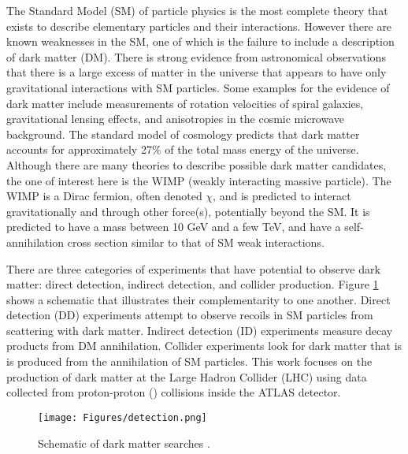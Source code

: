 \label{chapter:introduction}

The Standard Model (SM) of particle physics is the most complete theory that exists to describe elementary particles and their interactions. However there are known weaknesses in the SM, one of which is the failure to include a description of dark matter (DM). There is strong evidence from astronomical observations that there is a large excess of matter in the universe that appears to have only gravitational interactions with SM particles. Some examples for the evidence of dark matter include measurements of rotation velocities of spiral galaxies, gravitational lensing effects, and anisotropies in the cosmic microwave background. The standard model of cosmology predicts that dark matter accounts for approximately 27\% of the total mass energy of the universe. Although there are many theories to describe possible dark matter candidates, the one of interest here is the WIMP (weakly interacting massive particle). The WIMP is a Dirac fermion, often denoted $\chi$, and is predicted to interact gravitationally and through other force(s), potentially beyond the SM. It is predicted to have a mass between 10 GeV and a few TeV, and have a self-annihilation cross section similar to that of SM weak interactions.

There are three categories of experiments that have potential to observe dark matter: direct detection, indirect detection, and collider production. Figure \ref{fig:detection} shows a schematic that illustrates their complementarity to one another. Direct detection (DD) experiments attempt to observe recoils in SM particles from scattering with dark matter. Indirect detection (ID) experiments measure decay products from DM annihilation. Collider experiments look for dark matter that is is produced from the annihilation of SM particles. This work focuses on the production of dark matter at the Large Hadron Collider (LHC) using data collected from proton-proton (\pp) collisions inside the ATLAS detector.

\begin{figure}[htb]
\centering
\texttt{[image: Figures/detection.png]}
\caption{Schematic of dark matter searches \cite{Undagoitia:2015gya}.}
\label{fig:detection}
\end{figure}

